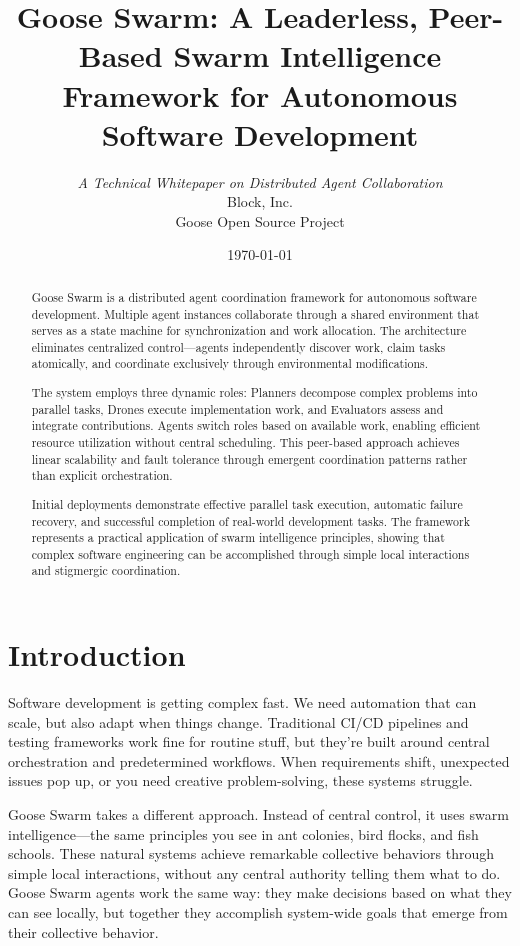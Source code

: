 \documentclass[11pt,a4paper]{article}
\title{\textbf{Goose Swarm: A Leaderless, Peer-Based Swarm Intelligence Framework for Autonomous Software Development}}
\author{
    \textit{A Technical Whitepaper on Distributed Agent Collaboration}\\[2mm]
    Block, Inc.\\
    Goose Open Source Project
}
\date{\today}
\begin{document}
\maketitle

\begin{abstract}
\noindent
Goose Swarm is a distributed agent coordination framework for autonomous software development. Multiple agent instances collaborate through a shared environment that serves as a state machine for synchronization and work allocation. The architecture eliminates centralized control---agents independently discover work, claim tasks atomically, and coordinate exclusively through environmental modifications.

The system employs three dynamic roles: Planners decompose complex problems into parallel tasks, Drones execute implementation work, and Evaluators assess and integrate contributions. Agents switch roles based on available work, enabling efficient resource utilization without central scheduling. This peer-based approach achieves linear scalability and fault tolerance through emergent coordination patterns rather than explicit orchestration.

Initial deployments demonstrate effective parallel task execution, automatic failure recovery, and successful completion of real-world development tasks. The framework represents a practical application of swarm intelligence principles, showing that complex software engineering can be accomplished through simple local interactions and stigmergic coordination.
\end{abstract}

\section{Introduction}

Software development is getting complex fast. We need automation that can scale, but also adapt when things change. Traditional CI/CD pipelines and testing frameworks work fine for routine stuff, but they're built around central orchestration and predetermined workflows. When requirements shift, unexpected issues pop up, or you need creative problem-solving, these systems struggle.

Goose Swarm takes a different approach. Instead of central control, it uses swarm intelligence---the same principles you see in ant colonies, bird flocks, and fish schools. These natural systems achieve remarkable collective behaviors through simple local interactions, without any central authority telling them what to do. Goose Swarm agents work the same way: they make decisions based on what they can see locally, but together they accomplish system-wide goals that emerge from their collective behavior.
\end{document}
